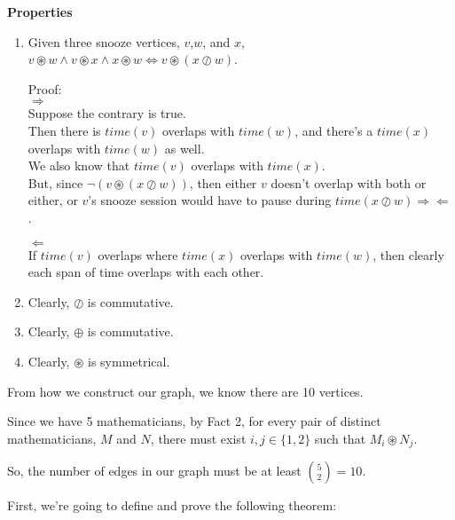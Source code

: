 \documentclass[fleqn]{article}
\begin{document}
\textbf{Properties}
\begin{enumerate}
  \item Given three snooze vertices, $v$,$w$, and $x$,\\
        $v \circledast w \wedge 
         v \circledast x \wedge 
         x \circledast w \Leftrightarrow 
         v \circledast (x \oslash w)$.

        Proof:\\
        $\Rightarrow$\\
        Suppose the contrary is true.\\
        Then there is $time(v)$ overlaps with $time(w)$,
        and there's a $time(x)$ overlaps with $time(w)$ as well.\\
        We also know that $time(v)$ overlaps with $time(x)$.\\
        But, since $\neg(v \circledast (x \oslash w))$, then either
        $v$ doesn't overlap with both or either, or 
        $v$'s snooze session would have to pause during
        $time(x \oslash w) \Rightarrow \Leftarrow$.

         $\Leftarrow$\\
         If $time(v)$ overlaps where $time(x)$ overlaps with $time(w)$,
         then clearly each span of time overlaps with each  other.
  \item Clearly, $\oslash$ is commutative.
  \item Clearly, $\oplus$ is commutative.
  \item Clearly, $\circledast$ is symmetrical.
\end{enumerate}

From how we construct our graph, we know there are 10 vertices.

Since we have 5 mathematicians, by Fact 2, for every pair of distinct mathematicians, $M$ and $N$, there must exist $i,j \in \lbrace 1,2 \rbrace$ such that $M_i \circledast N_j$.

So, the number of edges in our graph must be at least ${5 \choose 2} = 10$.

First, we're going to define and prove the following theorem:
\end{document}
